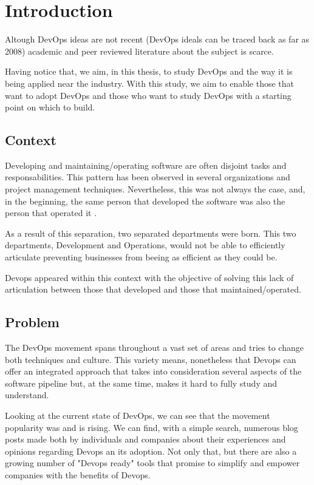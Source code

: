 \chapter{Introduction} \label{chap:introduction}
	Altough DevOps ideas are not recent (DevOps ideals can be traced back as far as 2008) academic and peer reviewed literature about the subject is scarce.

	Having notice that, we aim, in this thesis, to study DevOps and the way it is being applied near the industry. With this study, we aim to enable those that want to adopt DevOps and those who want to study DevOps with a starting point on which to build.






	\section{Context} \label{chap:introduction:sec:context}
	Developing and maintaining/operating software are often disjoint tasks and responsabilities. This pattern has been observed in several organizations and project management techniques. Nevertheless, this was not always the case, and, in the beginning, the same person that developed the software was also the person that operated it \cite{Loukides2012}.

	As a result of this separation, two separated departments were born. This two departments, Development and Operations, would not be able to efficiently articulate preventing businesses from beeing as efficient as they could be.

	Devops appeared within this context with the objective of solving this lack of articulation between those that developed and those that maintained/operated.





	\section{Problem} \label{chap:introduction:sec:problem}

	The DevOps movement spans throughout a vast set of areas and tries to change both techniques and culture. This variety means, nonetheless that Devops can offer an integrated approach that takes into consideration several aspects of the software pipeline but, at the same time, makes it hard to fully study and understand.

	Looking at the current state of DevOps, we can see that the movement popularity was and is rising. We can find, with a simple search, numerous blog posts made both by individuals and companies about their experiences and opinions regarding Devops an its adoption. Not only that, but there are also a growing number of "Devops ready" tools that promise to simplify and empower companies with the benefits of Devops.

